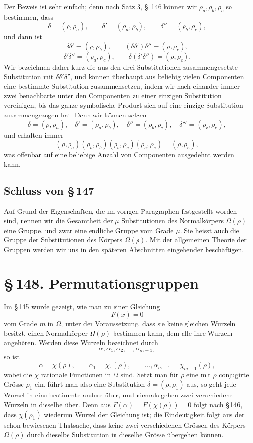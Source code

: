 \documentclass[11pt]{article}
\providecommand{\sect}[2]{\section*{\S\,#1. #2}}
\begin{document}
Der Beweis ist sehr einfach; denn nach Satz 3, §.\,146 können wir $\rho_a,\rho_b,\rho_c$ so bestimmen, dass
\[
\tag{4}
        \delta=(\rho,\rho_a),\qquad
        \delta'=(\rho_a,\rho_b),\qquad
        \delta''=(\rho_b,\rho_c),
\]
und dann ist
\[
\delta\delta'=(\rho,\rho_b),\qquad
(\delta\delta')\delta''=(\rho,\rho_c),
\]
\[
\delta'\delta''=(\rho_a,\rho_c),\qquad
\delta(\delta'\delta'')=(\rho,\rho_c).
\]
Wir bezeichnen daher kurz die aus den drei Substitutionen zusammengesetzte Substitution mit $\delta\delta'\delta''$, und können überhaupt aus beliebig vielen Componenten eine bestimmte Substitution zusammensetzen, indem wir nach einander immer zwei benachbarte unter den Componenten zu einer einzigen Substitution vereinigen, bis das ganze symbolische Product sich auf eine einzige Substitution zusammengezogen hat. Denn wir können setzen
\[
        \delta=(\rho,\rho_a),\quad
        \delta'=(\rho_a,\rho_b),\quad
        \delta''=(\rho_b,\rho_c),\quad
        \delta'''=(\rho_c,\rho_e),
\]
und erhalten immer
\[
        (\rho,\rho_a)(\rho_a,\rho_b)(\rho_b,\rho_c)(\rho_c,\rho_e)
        =(\rho,\rho_e),
\]
was offenbar auf eine beliebige Anzahl von Componenten ausgedehnt werden kann.




\subsection*{Schluss von \S\,147}

Auf Grund der Eigenschaften, die im vorigen Paragraphen festgestellt worden sind, nennen wir die Gesamtheit der $\mu$ Substitutionen des Normalkörpers $\Omega(\rho)$ eine Gruppe, und zwar eine endliche Gruppe vom Grade $\mu$. Sie heisst auch die Gruppe der Substitutionen des Körpers $\Omega(\rho)$. Mit der allgemeinen Theorie der Gruppen werden wir uns in den späteren Abschnitten eingehender beschäftigen.

\sect{148}{Permutationsgruppen}

Im \S\,145 wurde gezeigt, wie man zu einer Gleichung
\[
        F(x)=0
\tag{1}
\]
vom Grade $m$ in $\Omega$, unter der Voraussetzung, dass sie keine gleichen Wurzeln besitzt, einen Normalkörper $\Omega(\rho)$ bestimmen kann, dem alle ihre Wurzeln angehören. Werden diese Wurzeln bezeichnet durch
\[
        \alpha,\alpha_1,\alpha_2,\ldots,\alpha_{m-1},
\tag{2}
\]
so ist
\[
        \alpha=\chi(\rho),\qquad
        \alpha_1=\chi_1(\rho),\qquad \ldots,
        \alpha_{m-1}=\chi_{m-1}(\rho),
\tag{3}
\]
wobei die $\chi$ rationale Functionen in $\Omega$ sind. Setzt man für $\rho$ eine mit $\rho$ conjugirte Grösse $\rho_1$ ein, führt man also eine Substitution $\delta=(\rho,\rho_1)$ aus, so geht jede Wurzel in eine bestimmte andere über, und niemals gehen zwei verschiedene Wurzeln in dieselbe über. Denn aus $F(\alpha)=F(\chi(\rho))=0$ folgt nach \S\,146, dass $\chi(\rho_1)$ wiederum Wurzel der Gleichung ist; die Eindeutigkeit folgt aus der schon bewiesenen Thatsache, dass keine zwei verschiedenen Grössen des Körpers $\Omega(\rho)$ durch dieselbe Substitution in dieselbe Grösse übergehen können.
\end{document}
